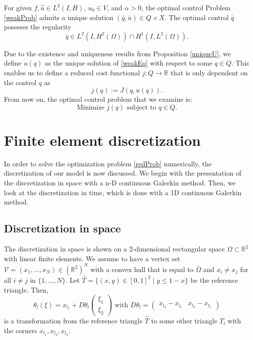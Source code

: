 \begin{prop}
For given $f,\hat{u}\in L^2(I,H)$, $u_0\in V$, and $\alpha>0$, the optimal control Problem \eqref{weakProb} admits a unique solution $(\bar{q},\bar{u})\in Q\times X$. The optimal control $\bar{q}$ posesses the regularity
\begin{displaymath}
\bar{q}\in L^2(I,H^2(\Omega))\cap H^1(I,L^2(\Omega)).
\end{displaymath}
\end{prop}

Due to the existence and uniqueness results from Proposition \ref{uniqueU}, we define $u(q)$ as the unique solution of \eqref{weakEq} with respect to some $q\in Q$. This enables us to define a reduced cost functional $j:Q\to \mathbb{R}$ that is only dependent on the control $q$ as
\begin{displaymath}
j(q):=J(q,u(q)).
\end{displaymath}
From now on, the optimal control problem that we examine is:
\begin{equation}
\label{redProb}
\text{Minimize }j(q)\text{ subject to }q\in Q.
\end{equation}

\section{Finite element discretization}
In order to solve the optimization problem \eqref{redProb} numerically, the discretization of our model is now discussed. We begin with the presentation of the discretization in space with a n-D continuous Galerkin method. Then, we look at the discretization in time, which is done with a 1D continuous Galerkin method.

\subsection{Discretization in space}
The discretization in space is shown on a 2-dimensional rectangular space $\Omega\subset\mathbb{R}^2$ with linear finite elements. We assume to have a vertex set $\mathcal{V}=(x_1,\dotsc,x_N)\in(\mathbb{R}^2)^N$ with a convex hull that is equal  to $\bar{\Omega}$ and $x_i\neq x_j$ for all $i\neq j$ in $\{1,\dotsc,N\}$. Let $\hat{T}=\{(x,y)\in[0,1]^2\mid y \leq 1-x\}$ be the reference triangle. Then,
\begin{displaymath}
\theta_l(\xi)=x_{l_1} + D\theta_l \begin{pmatrix} \xi_1 \\ \xi_2 \end{pmatrix} \text{ with } D\theta_l = \begin{pmatrix} x_{l_2}-x_{l_1} & x_{l_3}-x_{l_1} \end{pmatrix}
\end{displaymath}
is a transformation from the reference triangle $\hat{T}$ to some other triangle $T_l$ with the corners $x_{l_1}, x_{l_2}, x_{l_3}$.


